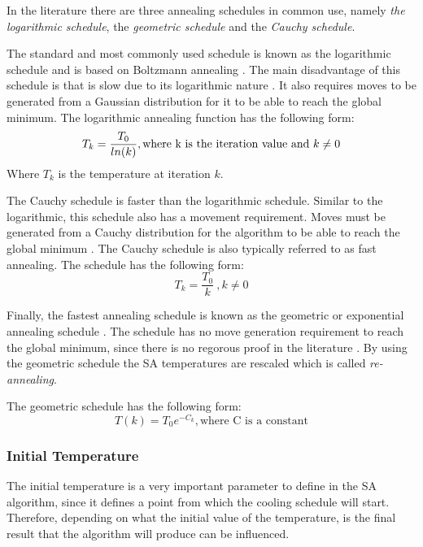 In the literature there are three annealing schedules in common use, namely \emph{the logarithmic schedule}, the \emph{geometric schedule} and the \emph{Cauchy schedule}\cite{VeryFastSAImageEnchancement,SASingleMultiObj}. 

The standard and most commonly used schedule is known as the logarithmic schedule and is based on Boltzmann annealing \cite{VeryFastSAImageEnchancement}. The main disadvantage of this schedule is that is slow due to its logarithmic nature \cite{VeryFastSAImageEnchancement}. It also requires moves to be generated from a Gaussian distribution for it to be able to reach the global minimum\cite{SASingleMultiObj}. The logarithmic annealing function has the following form:
\begin{equation}
\label{eq:logcooling}
	T_k = \frac{T_0}{ln(k)},\text{where k is the iteration value and } k \neq 0\\
\end{equation}
Where $T_k$ is the temperature at iteration $k$.

The Cauchy schedule is faster than the logarithmic schedule. Similar to the logarithmic, this schedule also has a movement requirement. Moves must be generated from a Cauchy distribution for the algorithm to be able to reach the global minimum \cite{SASingleMultiObj,VeryFastSAImageEnchancement}. The Cauchy schedule is also typically referred to as fast annealing\cite{VeryFastSAImageEnchancement}. The schedule has the following form:
\begin{equation}
\label{eq:cauchycooling}
	T_k = \frac{T_0}{k} ~, k \neq 0
\end{equation}

Finally, the fastest annealing schedule is known as the geometric or exponential annealing schedule \cite{SASingleMultiObj}. The schedule has no move generation requirement to reach the global minimum, since there is no regorous proof in the literature \cite{SASingleMultiObj}. By using the geometric schedule the SA temperatures are rescaled which is called \emph{re-annealing}\cite{VeryFastSAImageEnchancement}.

The geometric schedule has the following form:
\begin{equation}
\label{eq:geocooling}
	T(k)=T_0e^{-C_k},\text{where C is a constant}
\end{equation}

\subsubsection{Initial Temperature}
The initial temperature is a very important parameter to define in the SA algorithm, since it defines a point from which the cooling schedule will start\cite{VariousCoolingSA}. Therefore, depending on what the initial value of the temperature, is the final result that the algorithm will produce can be influenced\cite{SALongestCommon,AutoConfigSA}.

